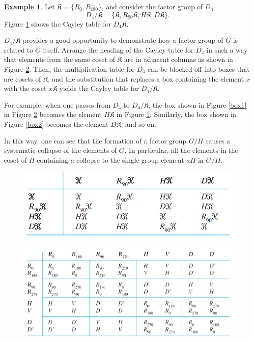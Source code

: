 \documentclass{article}
\theoremstyle{definition}
\newtheorem{example}{Example}[section]
\begin{document}
     \begin{example}
        Let $\mathfrak{K} = \{R_0,R_{180}\}$, and consider the factor group of $D_4$
        \begin{equation*}
            D_4/\mathfrak{K} = \{\mathfrak{K},R_{90}\mathfrak{K},H\mathfrak{K},D\mathfrak{K}\}.
        \end{equation*}
        Figure \ref{table9.1} shows the Cayley table for $D_4\mathfrak{K}$.
        
        $D_4/\mathfrak{K}$ provides a good opportunity to demonstrate how a factor group of $G$ is related to $G$ itself. Arrange the heading of the Cayley table for $D_4$ in such a way that elements from the same coset of $\mathfrak{K}$ are in adjacent columns as shown in Figure \ref{table9.2}. Then, the multiplication table for $D_4$ can be blocked off into boxes that are cosets of $\mathfrak{K}$, and the substitution that replaces a box containing the element $x$ with the coset $x\mathfrak{K}$ yields the Cayley table for $D_4/\mathfrak{K}$.
        
        For example, when one passes from $D_4$ to $D_4/\mathfrak{K}$, the box shown in Figure \ref{box1} in Figure \ref{table9.2} becomes the element $H\mathfrak{K}$ in Figure \ref{table9.1}. Similarly, the box shown in Figure \ref{box2} becomes the element $D\mathfrak{K}$, and so on.
        
        In this way, one can see that the formation of a factor group $G/H$ causes a systematic collapse of the elements of $G$. In particular, all the elements in the coset of $H$ containing $a$ collapse to the single group element $aH$ in $G/H$.
        
        \begin{figure}[!htbp]
            \centering
            \includegraphics[width=0.8\linewidth]{figures/table9.1.png}
            \caption{}
            \label{table9.1}
        \end{figure}
        
        \begin{figure}[!htbp]
            \centering
            \includegraphics[width=\linewidth]{figures/table9.2.png}
            \caption{}
            \label{table9.2}
        \end{figure}
        

\end{example}
\end{document}
